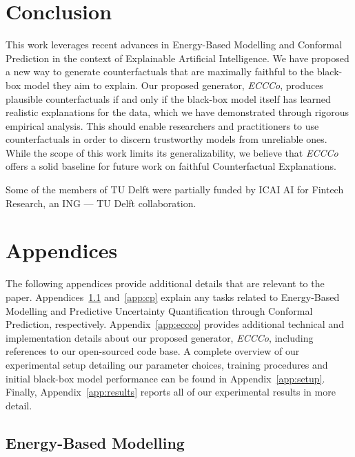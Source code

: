 \documentclass{article}
\begin{document}
\section{Conclusion}

This work leverages recent advances in Energy-Based Modelling and Conformal Prediction in the context of Explainable Artificial Intelligence. We have proposed a new way to generate counterfactuals that are maximally faithful to the black-box model they aim to explain. Our proposed generator, \textit{ECCCo}, produces plausible counterfactuals if and only if the black-box model itself has learned realistic explanations for the data, which we have demonstrated through rigorous empirical analysis. This should enable researchers and practitioners to use counterfactuals in order to discern trustworthy models from unreliable ones. While the scope of this work limits its generalizability, we believe that \textit{ECCCo} offers a solid baseline for future work on faithful Counterfactual Explanations.

\begin{ack}

Some of the members of TU Delft were partially funded by ICAI AI for Fintech Research, an ING — TU Delft
collaboration.

\end{ack}



\pagebreak

\appendix
\section*{Appendices}
\renewcommand{\thesubsection}{\Alph{subsection}}

The following appendices provide additional details that are relevant to the paper. Appendices~\ref{app:jem} and~\ref{app:cp} explain any tasks related to Energy-Based Modelling and Predictive Uncertainty Quantification through Conformal Prediction, respectively. Appendix~\ref{app:eccco} provides additional technical and implementation details about our proposed generator, \textit{ECCCo}, including references to our open-sourced code base. A complete overview of our experimental setup detailing our parameter choices, training procedures and initial black-box model performance can be found in Appendix~\ref{app:setup}. Finally, Appendix~\ref{app:results} reports all of our experimental results in more detail.

\subsection{Energy-Based Modelling}\label{app:jem}
\end{document}

